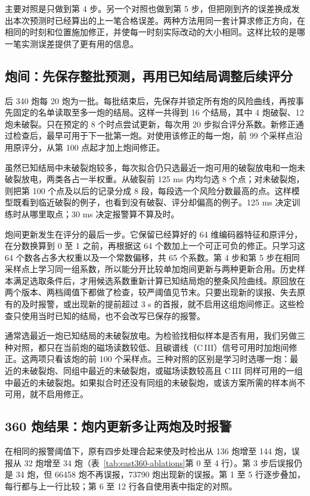 主要对照是只做到第 4 步。另一个对照也做到第 5 步，但把刚到齐的误差换成发出本次预测时已经算出的上一笔合格误差。两种方法用同一套计算求修正方向，在相同的时刻和位置施加修正，并使每一时刻实际改动的大小相同。这样比较的是哪一笔实测误差提供了更有用的信息。

\subsection{炮间：先保存整批预测，再用已知结局调整后续评分}

后 340 炮每 20 炮为一批。每批结束后，先保存并锁定所有炮的风险曲线，再按事先固定的名单读取至多一炮的结局。这样一共得到 16 个结局，其中 4 炮破裂、12 炮未破裂。只在预定的 8 个时点尝试更新，每次用 20 步拟合评分系数。新修正通过检查后，最早可用于下一批第一炮。对使用该修正的每一炮，前 99 个采样点沿用原评分，从第 100 点起才加上炮间修正。

虽然已知结局中未破裂炮较多，每次拟合仍只选最近一炮可用的破裂放电和一炮未破裂放电，两类各占一半权重。从破裂前 125 ms 内均匀选 8 个点；对未破裂炮，则把第 100 个点及以后的记录分成 8 段，每段选一个风险分数最高的点。这样模型既看到临近破裂的例子，也看到没有破裂、评分却偏高的例子。125 ms 决定训练时从哪里取点；30 ms 决定报警算不算及时。

炮间更新发生在评分的最后一步。它保留已经算好的 64 维编码器特征和原评分，在分数换算到 0 至 1 之前，再根据这 64 个数加上一个可正可负的修正。只学习这 64 个数各占多大权重以及一个常数偏移，共 65 个系数。第 4 步和第 5 步在相同采样点上学习同一组系数，所以能分开比较单加炮间更新与两种更新合用。历史样本满足选取条件后，才用候选系数重新计算已知结局炮的整条风险曲线。原回放在两个版本、两档阈值下都做了检查，较严阈值见节末。只要出现新的误报、失去原有的及时报警，或出现新的提前超过 3 s 的首报，就不启用这组炮间修正。这些检查只使用当时已知的结局，也不会改写已保存的报警。

通常选最近一炮已知结局的未破裂放电。为检验找相似样本是否有用，我们另做三种对照，都只在当前炮的磁场读数较低、且碳谱线（C\,III）信号可用时加炮间修正。这两项只看该炮的前 100 个采样点。三种对照的区别是学习时选哪一炮：最近的未破裂炮、同组中最近的未破裂炮，或磁场读数较高且 C\,III 同样可用的一组中最近的未破裂炮。如果拟合时还没有同组的未破裂炮，或该方案所需的样本尚不可用，就不启用修正。

\subsection{360 炮结果：炮内更新多让两炮及时报警}

在相同的报警阈值下，原有四步处理合起来使及时检出从 136 炮增至 144 炮，误报从 32 炮增至 34 炮（表~\ref{tab:east360-ablations}第 0 至 4 行）。第 3 步后误报仍是 34 炮，但 66458 炮不再误报，73790 炮出现新的误报。第 1 至 5 行逐步叠加，每行都与上一行比较；第 6 至 12 行各自使用表中指定的对照。


